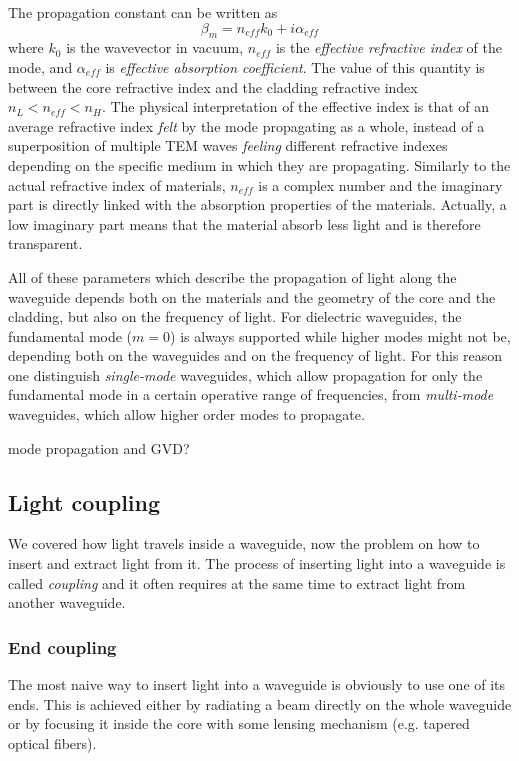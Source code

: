 The propagation constant can be written as
\begin{equation}
\beta_m = n_{eff} k_0 + i \alpha_{eff}
\end{equation}
where $k_0$ is the wavevector in vacuum, $n_{eff}$ is the \textit{effective refractive index} of the mode, and $\alpha_{eff}$ is \textit{effective absorption coefficient}.
The value of this quantity is between the core refractive index and the cladding refractive index $n_L < n_{eff} < n_H$.
The physical interpretation of the effective index is that of an average refractive index \textit{felt} by the mode propagating as a whole, instead of a superposition of multiple TEM waves \textit{feeling} different refractive indexes depending on the specific medium in which they are propagating.
Similarly to the actual refractive index of materials, $n_{eff}$ is a complex number and the imaginary part is directly linked with the absorption properties of the materials.
Actually, a low imaginary part means that the material absorb less light and is therefore transparent.

All of these parameters which describe the propagation of light along the waveguide depends both on the materials and the geometry of the core and the cladding, but also on the frequency of light.
For dielectric waveguides, the fundamental mode ($m=0$) is always supported while higher modes might not be, depending both on the waveguides and on the frequency of light.
For this reason one distinguish \textit{single-mode} waveguides, which allow propagation for only the fundamental mode in a certain operative range of frequencies, from \textit{multi-mode} waveguides, which allow higher order modes to propagate.

\LARGE { mode propagation and GVD? } \normalsize

\subsection{Light coupling}
\label{ssec:light_coupling}
We covered how light travels inside a waveguide, now the problem on how to insert and extract light from it.
The process of inserting light into a waveguide is called \textit{coupling} and it often requires at the same time to extract light from another waveguide.

\subsubsection{End coupling}
\label{sssec:end_coupling}
The most naive way to insert light into a waveguide is obviously to use one of its ends.
This is achieved either by radiating a beam directly on the whole waveguide or by focusing it inside the core with some lensing mechanism (e.g. tapered optical fibers).

